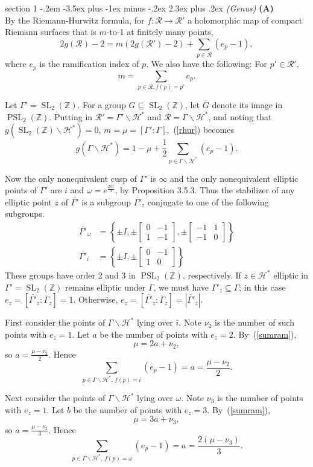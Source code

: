 \documentclass[12pt]{article}
\makeatletter
\theoremstyle{norm}
\newcommand{\Z}[0]{\mathbb{Z}}
\providecommand{\cal}[1]{\mathcal{#1}}
\renewcommand{\cal}[1]{\mathcal{#1}}
\newcommand{\rc}[1]{\frac{1}{#1}}
\newcommand{\subeq}[0]{\subseteq}
\newcommand{\Ga}[0]{\Gamma}
\newcommand{\om}[0]{\omega}
\newcommand{\bc}[1]{\left\{ {#1} \right\}}
\newcommand{\subprob}[1]{\noindent\textbf{#1}\\}
\newcommand{\PSL}{\operatorname{PSL}}
\newcommand{\SL}{\operatorname{SL}}
\newcommand{\bs}[0]{\backslash}
\newcommand{\ol}[1]{\overline{#1}}
\newcommand{\smatt}[4]{
\left[
\begin{smallmatrix}
{#1}&{#2}\\
{#3}&{#4}
\end{smallmatrix}
\right]}
\newenvironment{problem}{\@startsection
       {section}
       {1}
       {-.2em}
       {-3.5ex plus -1ex minus -.2ex}
       {2.3ex plus .2ex}
       {\pagebreak[3]%
       \large\bf\noindent{Problem }
       }
       }
       {%
       }
\makeatother
\begin{document}
\begin{problem}{\it (Genus)}
\subprob{(A)}
By the Riemann-Hurwitz formula, for $f:\cal R\to \cal R'$ a holomorphic map of compact Riemann surfaces that is $m$-to-1 at finitely many points,
\begin{equation}\label{rhur}
2g(\cal R)-2=m(2g(\cal R')-2)+\sum_{p\in \cal R} (e_p-1),
\end{equation}
where $e_p$ is the ramification index of $p$. We also have the following: For $p'\in \cal R'$,
\begin{equation}\label{sumram}
m=\sum_{p\in \cal R, f(p)=p'}e_p.
\end{equation}

Let $\Ga'=\SL_2(\Z)$. For a group $G\subeq \SL_2(\Z)$, let $\overline{G}$ denote its image in $\PSL_2(\Z)$. 
Putting in $\cal R'=\Ga'\bs\cal H^*$ and $\cal R=\Ga\bs \cal H^*$, and noting that $g(\SL_2(\Z)\bs \cal H^*)=0$, $m=\mu=[\Ga':\Ga]$,~(\ref{rhur}) becomes
\[
g(\Ga\bs \cal H^*)=1-\mu+\rc{2}\sum_{p\in \Ga\bs \cal H^*} (e_p-1).
\]

Now the only nonequivalent cusp of $\Ga'$ is $\infty$ and the only nonequivalent elliptic points of $\Ga'$ %
are $i$ and $\om=e^{\frac{2\pi i}{3}}$, by Proposition 3.5.3. 
Thus the stabilizer of any elliptic point $z$ of $\overline{\Ga'}$ is a subgroup $\ol{\Ga'}_z$ conjugate to one of the following subgroups.
\begin{align}
\overline{\Ga'}_{\omega}&=\bc{
\pm I,\pm \smatt 0{-1}{1}{-1},\pm \smatt {-1}{1}{-1}{0}
}
\label{stabom}\\
\overline{\Ga'}_{i}&=\bc{
\pm I,\pm \smatt 0{-1}{1}{0}
}\label{stabi}
\end{align}
These groups have order 2 and 3 in $\PSL_2(\Z)$, respectively. If $z\in \cal H^*$ elliptic in $\Ga'=\SL_2(\Z)$ remains elliptic under $\Ga$, we must have $\Ga'_z\subeq \Ga$; in this case $e_z=[\overline{\Ga'}_z:\overline{\Ga}_z]=1$. Otherwise, $e_z=[\overline{\Ga'}_z:\overline{\Ga}_z]=|\ol{\Ga'}_z|$.

First consider the points of $\Ga\bs \cal H^*$ lying over $i$. Note $\nu_2$ is the number of such points with $e_z=1$. Let $a$ be the number of points with $e_z=2$.
 By~(\ref{sumram}),
\[\mu=2a+\nu_2,\]
so $a=\frac{\mu-\nu_2}{2}$. Hence
\begin{equation}\label{v2}
\sum_{p\in \Ga\bs \cal H^*,\, f(p)=i}(e_p-1)=a= \frac{\mu-\nu_2}{2}.
\end{equation}

Next consider the points of $\Ga\bs \cal H^*$ lying over $\omega$. Note $\nu_3$ is the number of points with $e_z=1$. Let $b$ be the number of points with $e_z=3$.
 By~(\ref{sumram}),
\[\mu=3a+\nu_3,\]
so $a=\frac{\mu-\nu_3}{3}$. Hence
\begin{equation}\label{v3}
\sum_{p\in \Ga\bs \cal H^*,\, f(p)=\omega}(e_p-1)=a= \frac{2(\mu-\nu_3)}{3}.
\end{equation}


\end{problem}
\end{document}
